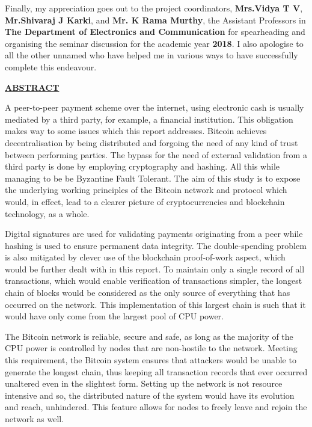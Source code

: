 \documentclass[12pt,a4paper]{report}
\begin{document}
Finally, my appreciation goes out to the project coordinators, \textbf{ Mrs.Vidya T V},\textbf{ Mr.Shivaraj J Karki}, and \textbf{ Mr. K Rama Murthy}, the Assistant Professors in \textbf{The Department of Electronics and Communication} for spearheading and organising the seminar discussion for the academic year  
\textbf{2018}. I also apologise to all the other unnamed who have helped me in various ways to have successfully complete this endeavour.

\newpage
\begin{center}\underline{ \Large \textbf{ABSTRACT}}\end{center}
\vspace{5mm}
 \begin{justify}
 A peer-to-peer payment scheme over the internet, using electronic cash is usually mediated by a third party, for example, a financial institution. This obligation makes way to some issues which this report addresses. Bitcoin achieves decentralisation by being distributed and forgoing the need of any kind of trust between performing parties. The bypass for the need of external validation from a third party is done by employing cryptography and hashing. All this while managing to be be Byzantine Fault Tolerant. The aim of this study is to expose the underlying working principles of the Bitcoin  network and protocol which would, in effect, lead to a clearer picture of cryptocurrencies and blockchain technology, as a whole.
 \vspace{5mm}
  
 Digital signatures are used for validating payments originating from a peer while hashing is used to ensure permanent data integrity. The double-spending problem is also mitigated by clever use of the blockchain proof-of-work aspect, which would be further dealt with in this report. To maintain only a single record of all transactions, which would enable verification of transactions simpler, the longest chain of blocks would be considered as the only source of everything that has occurred on the network. This implementation of this largest chain is such that it would have only come from the largest pool of CPU power.
  \vspace{5mm}
  
 The Bitcoin network is reliable, secure and safe, as long as the majority of the CPU power is controlled by nodes that are non-hostile to the network. Meeting this requirement, the Bitcoin system ensures that attackers would be unable to generate the longest chain, thus keeping all transaction records that ever occurred unaltered even in the slightest form. Setting up the network is not resource intensive and so, the distributed nature of the system would have its evolution and reach, unhindered. This feature allows for nodes to freely leave and rejoin the network as well.
 \vspace{10mm} 
 

\end{justify}
\end{document}
